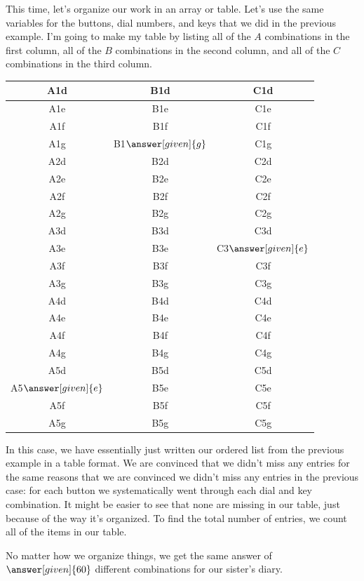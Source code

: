 \documentclass{ximera}
\begin{document}
\begin{example}
This time, let's organize our work in an array or table. Let's use the same variables for the buttons, dial numbers, and keys that we did in the previous example. I'm going to make my table by listing all of the $A$ combinations in the first column, all of the $B$ combinations in the second column, and all of the $C$ combinations in the third column.
\begin{image}
\begin{tabular}{|c|c|c|} \hline
A1d & B1d & C1d \\ \hline
A1e & B1e & C1e \\ \hline
A1f & B1f & C1f \\ \hline
A1g & B1$\answer[given]{g}$ & C1g \\ \hline
A2d & B2d & C2d \\ \hline
A2e & B2e & C2e \\ \hline
A2f & B2f & C2f \\ \hline
A2g & B2g & C2g \\ \hline
A3d & B3d & C3d \\ \hline
A3e & B3e & C3$\answer[given]{e}$ \\ \hline
A3f & B3f & C3f \\ \hline
A3g & B3g & C3g \\ \hline
A4d & B4d & C4d \\ \hline
A4e & B4e & C4e \\ \hline
A4f & B4f & C4f \\ \hline
A4g & B4g & C4g \\ \hline
A5d & B5d & C5d \\ \hline
A5$\answer[given]{e}$ & B5e & C5e \\ \hline
A5f & B5f & C5f \\ \hline
A5g & B5g & C5g \\ \hline
\end{tabular}
\end{image}
In this case, we have essentially just written our ordered list from the previous example in a table format. We are convinced that we didn't miss any entries for the same reasons that we are convinced we didn't miss any entries in the previous case: for each button we systematically went through each dial and key combination. It might be easier to see that none are missing in our table, just because of the way it's organized. To find the total number of entries, we count all of the items in our table.

No matter how we organize things, we get the same answer of $\answer[given]{60}$ different combinations for our sister's diary.

\end{example}
\end{document}
